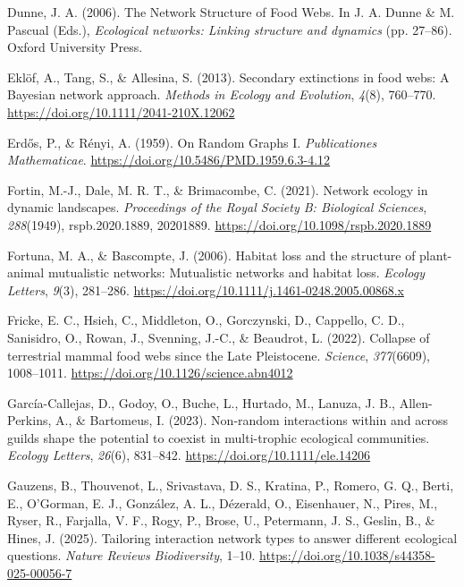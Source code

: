 \documentclass[
]{article}
\newlength{\cslhangindent}
\newenvironment{CSLReferences}[2] %
 {\begin{list}{}{%
  \setlength{\itemindent}{0pt}
  \setlength{\leftmargin}{0pt}
  \setlength{\parsep}{0pt}
  \ifodd #1
   \setlength{\leftmargin}{\cslhangindent}
   \setlength{\itemindent}{-1\cslhangindent}
  \fi
  \setlength{\itemsep}{#2\baselineskip}}}
 {\end{list}}
\begin{document}
\begin{CSLReferences}{1}{0}
Dunne, J. A. (2006). The {Network Structure} of {Food Webs}. In J. A.
Dunne \& M. Pascual (Eds.), \emph{Ecological networks: {Linking}
structure and dynamics} (pp. 27--86). Oxford University Press.

Eklöf, A., Tang, S., \& Allesina, S. (2013). Secondary extinctions in
food webs: A {Bayesian} network approach. \emph{Methods in Ecology and
Evolution}, \emph{4}(8), 760--770.
\url{https://doi.org/10.1111/2041-210X.12062}

Erdős, P., \& Rényi, A. (1959). On {Random Graphs I}.
\emph{Publicationes Mathematicae}.
\url{https://doi.org/10.5486/PMD.1959.6.3-4.12}

Fortin, M.-J., Dale, M. R. T., \& Brimacombe, C. (2021). Network ecology
in dynamic landscapes. \emph{Proceedings of the Royal Society B:
Biological Sciences}, \emph{288}(1949), rspb.2020.1889, 20201889.
\url{https://doi.org/10.1098/rspb.2020.1889}

Fortuna, M. A., \& Bascompte, J. (2006). Habitat loss and the structure
of plant-animal mutualistic networks: {Mutualistic} networks and habitat
loss. \emph{Ecology Letters}, \emph{9}(3), 281--286.
\url{https://doi.org/10.1111/j.1461-0248.2005.00868.x}

Fricke, E. C., Hsieh, C., Middleton, O., Gorczynski, D., Cappello, C.
D., Sanisidro, O., Rowan, J., Svenning, J.-C., \& Beaudrot, L. (2022).
Collapse of terrestrial mammal food webs since the {Late Pleistocene}.
\emph{Science}, \emph{377}(6609), 1008--1011.
\url{https://doi.org/10.1126/science.abn4012}

García-Callejas, D., Godoy, O., Buche, L., Hurtado, M., Lanuza, J. B.,
Allen-Perkins, A., \& Bartomeus, I. (2023). Non-random interactions
within and across guilds shape the potential to coexist in multi-trophic
ecological communities. \emph{Ecology Letters}, \emph{26}(6), 831--842.
\url{https://doi.org/10.1111/ele.14206}

Gauzens, B., Thouvenot, L., Srivastava, D. S., Kratina, P., Romero, G.
Q., Berti, E., O'Gorman, E. J., González, A. L., Dézerald, O.,
Eisenhauer, N., Pires, M., Ryser, R., Farjalla, V. F., Rogy, P., Brose,
U., Petermann, J. S., Geslin, B., \& Hines, J. (2025). Tailoring
interaction network types to answer different ecological questions.
\emph{Nature Reviews Biodiversity}, 1--10.
\url{https://doi.org/10.1038/s44358-025-00056-7}


\end{CSLReferences}
\end{document}
